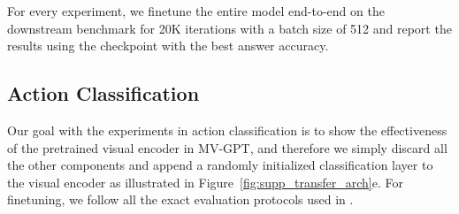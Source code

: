 \documentclass[10pt,twocolumn,letterpaper]{article}
\begin{document}
For every experiment, we finetune the entire model end-to-end on the downstream benchmark for 20K iterations with a batch size of 512 and report the results using the checkpoint with the best answer accuracy.

\subsection{Action Classification}
Our goal with the experiments in action classification is to show the effectiveness of the pretrained visual encoder in MV-GPT, and therefore we simply discard all the other components and append a randomly initialized classification layer to the visual encoder as illustrated in Figure~\ref{fig:supp_transfer_arch}e. 
For finetuning, we follow all the exact evaluation protocols used in \cite{arnab2021vivit}.
\end{document}
